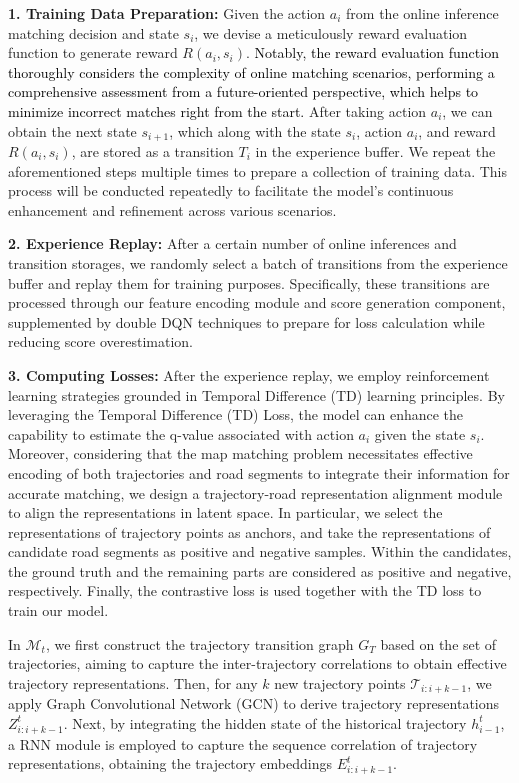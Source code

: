 \textbf{1. Training Data Preparation:} Given the action $a_i$ from the online inference matching decision and state $s_i$, we devise a meticulously reward evaluation function to generate reward $R(a_i,s_i)$. 
\textcolor{black}{Notably, the reward evaluation function thoroughly considers the complexity of online matching scenarios, performing a comprehensive assessment from a future-oriented perspective, which helps to minimize incorrect matches right from the start.}
After taking action $a_i$, we can obtain the next state $s_{i+1}$, which along with the state $s_i$, action $a_i$, and reward $R(a_i,s_i)$, are stored as a transition $T_i$ in the experience buffer. We repeat the aforementioned steps multiple times to prepare a collection of training data. This process will be conducted repeatedly to facilitate the model's continuous enhancement and refinement across various scenarios.

\textbf{2. Experience Replay:} After a certain number of online inferences and transition storages, we randomly select a batch of transitions from the experience buffer and replay them for training purposes. Specifically, these transitions are processed through our feature encoding module and score generation component, supplemented by double DQN techniques to prepare for loss calculation while reducing score overestimation.

\textbf{3. Computing Losses:} After the experience replay, we employ reinforcement learning strategies grounded in Temporal Difference (TD) learning principles. By leveraging the Temporal Difference (TD) Loss, the model can enhance the capability to estimate the q-value associated with action $a_i$ given the state $s_i$. Moreover, considering that the map matching problem necessitates effective encoding of both trajectories and road segments to integrate their information for accurate matching, we design a trajectory-road representation alignment module to align the representations in latent space. In particular, we select the representations of trajectory points as anchors, and take the representations of candidate road segments as positive and negative samples. Within the candidates, the ground truth and the remaining parts are considered as positive and negative, respectively. Finally, the contrastive loss is used together with the TD loss to train our model.



\iffalse
In $\mathcal{M}_t$, we first construct the trajectory transition graph $G_T$ based on the set of trajectories, aiming to capture the inter-trajectory correlations to obtain effective trajectory representations. Then, for any $k$ new trajectory points $\mathcal{T}_{i:i+k-1}$, we apply Graph Convolutional Network (GCN) to derive trajectory representations $Z_{i:i+k-1}^t$. Next, by integrating the hidden state of the historical trajectory $h_{i-1}^t$, a RNN module is employed to capture the sequence correlation of trajectory representations, obtaining the trajectory embeddings $E_{i:i+k-1}^t$.

